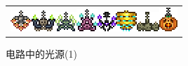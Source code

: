 \begin{figure}[!htp]
{\begin{tabular}[b]{c}
\includegraphics{figures/Steampunk_Chandelier.png}\quad\includegraphics{figures/Blue_Dungeon_Chandelier.png}\quad\includegraphics{figures/Green_Dungeon_Chandelier.png}\quad\includegraphics{figures/Pink_Dungeon_Chandelier.png}\quad\includegraphics{figures/Obsidian_Chandelier.png}\quad\includegraphics{figures/Golden_Chandelier.png}\quad\includegraphics{figures/Bone_Chandelier.png}\quad\includegraphics{figures/Jackelier.png}
\end{tabular}}%
\caption{电路中的光源(1)}
\end{figure}

